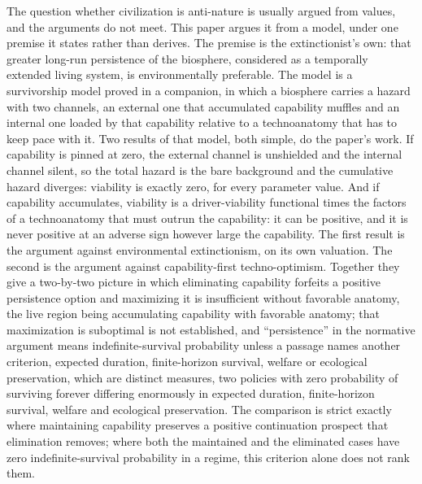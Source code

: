 The question whether civilization is anti-nature is usually argued from
values, and the arguments do not meet. This paper argues it from a
model, under one premise it states rather than derives. The premise is
the extinctionist's own: that greater long-run persistence of the
biosphere, considered as a temporally extended living system, is
environmentally preferable. The model is a survivorship model proved in
a companion, in which a biosphere carries a hazard with two channels, an
external one that accumulated capability muffles and an internal one
loaded by that capability relative to a technoanatomy that has to keep
pace with it. Two results of that model, both simple, do the paper's
work. If capability is pinned at zero, the external channel is
unshielded and the internal channel silent, so the total hazard is the
bare background and the cumulative hazard diverges: viability is
exactly zero, for every parameter value. And if capability accumulates,
viability is a driver-viability functional times the factors of a
technoanatomy that must outrun the capability: it can be positive, and it is never positive at an adverse
sign however large the capability. The first result is the argument
against environmental extinctionism, on its own valuation. The second
is the argument against capability-first techno-optimism. Together they give a two-by-two picture in which eliminating capability forfeits a positive persistence option and maximizing it is insufficient without favorable anatomy, the live region being accumulating capability with favorable anatomy; that maximization is suboptimal is not established, and ``persistence'' in the normative argument means indefinite-survival probability unless a passage names another criterion, expected duration, finite-horizon survival, welfare or ecological preservation, which are distinct measures, two policies with zero probability of surviving forever differing enormously in expected duration, finite-horizon survival, welfare and ecological preservation. The comparison is strict exactly where maintaining capability preserves a positive continuation prospect that elimination removes; where both the maintained and the eliminated cases have zero indefinite-survival probability in a regime, this criterion alone does not rank them.

